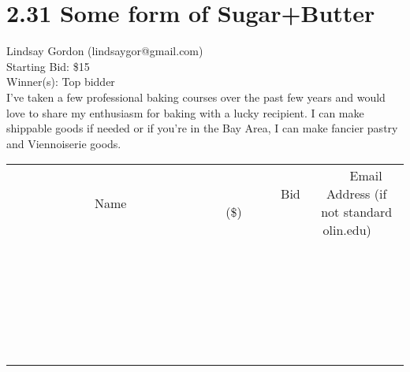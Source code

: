 \documentclass[11pt]{article}
\begin{document}
\section*{2.31 Some form of Sugar+Butter}
Lindsay Gordon (lindsaygor@gmail.com) \\
Starting Bid: \$15 \\
Winner(s): 
Top bidder \\
I've taken a few professional baking courses over the past few years and would love to share my enthusiasm for baking with a lucky recipient. I can make shippable goods if needed or if you're in the Bay Area, I can make fancier pastry and Viennoiserie goods. \\[6ex]
\begin{tabular}{c c c}
~~~~~~~~~~~~~Name~~~~~~~~~~~~~ & ~~~~~~~~~Bid (\$)~~~~~~~~~ & ~~~Email Address (if not standard olin.edu)~~~ \\
 & & \\
\hline
 & & \\
\hline
 & & \\
\hline
 & & \\
\hline
 & & \\
\hline
 & & \\
\hline
 & & \\
\hline
 & & \\
\hline
 & & \\
\hline
 & & \\
\hline
 & & \\
\hline
 & & \\
\hline
 & & \\
\hline
 & & \\
\hline
 & & \\
\hline
 & & \\
\hline
 & & \\
\hline
 & & \\
\hline
 & & \\
\hline
 & & \\
\hline
 & & \\
\hline
 & & \\
\hline
 & & \\
\hline
 & & \\
\hline
 & & \\
\hline
 & & \\
\hline
\end{tabular}
\clearpage
\end{document}
